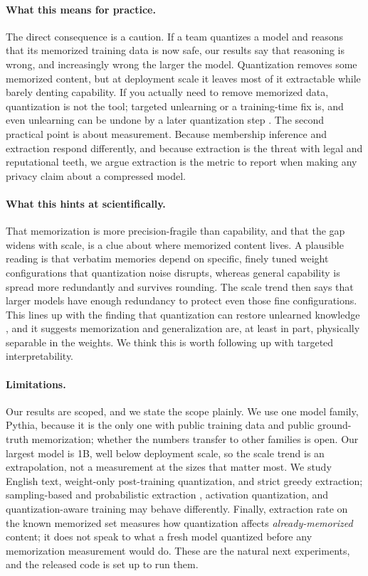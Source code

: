 \documentclass{article}
\begin{document}
\paragraph{What this means for practice.}
The direct consequence is a caution. If a team quantizes a model and reasons
that its memorized training data is now safe, our results say that reasoning
is wrong, and increasingly wrong the larger the model. Quantization removes
some memorized content, but at deployment scale it leaves most of it
extractable while barely denting capability. If you actually need to remove
memorized data, quantization is not the tool; targeted unlearning or a
training-time fix is, and even unlearning can be undone by a later
quantization step \citep{zhang2024catastrophic}. The second practical
point is about measurement. Because membership inference and extraction
respond differently, and because extraction is the threat with legal and
reputational teeth, we argue extraction is the metric to report when making
any privacy claim about a compressed model.

\paragraph{What this hints at scientifically.}
That memorization is more precision-fragile than capability, and that the gap
widens with scale, is a clue about where memorized content lives. A plausible
reading is that verbatim memories depend on specific, finely tuned weight
configurations that quantization noise disrupts, whereas general capability
is spread more redundantly and survives rounding. The scale trend then says
that larger models have enough redundancy to protect even those fine
configurations. This lines up with the finding that quantization can restore
unlearned knowledge \citep{zhang2024catastrophic}, and it suggests
memorization and generalization are, at least in part, physically separable
in the weights. We think this is worth following up with targeted
interpretability.

\paragraph{Limitations.}
Our results are scoped, and we state the scope plainly. We use one model
family, Pythia, because it is the only one with public training data and
public ground-truth memorization; whether the numbers transfer to other
families is open. Our largest model is 1B, well below deployment scale, so
the scale trend is an extrapolation, not a measurement at the sizes that
matter most. We study English text, weight-only post-training quantization,
and strict greedy extraction; sampling-based and probabilistic extraction
\citep{hayes2024measuring}, activation quantization, and quantization-aware
training may behave differently. Finally, extraction rate on the known
memorized set measures how quantization affects \emph{already-memorized}
content; it does not speak to what a fresh model quantized before any
memorization measurement would do. These are the natural next experiments,
and the released code is set up to run them.
\end{document}
